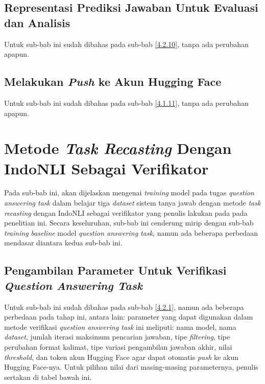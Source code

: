 \subsection{Representasi Prediksi Jawaban Untuk Evaluasi dan Analisis}
\label{4.3.12}
Untuk sub-bab ini sudah dibahas pada sub-bab \ref{4.2.10}, tanpa ada perubahan apapun.

\subsection{Melakukan \emph{Push} ke Akun Hugging Face}
\label{4.3.13}
Untuk sub-bab ini sudah dibahas pada sub-bab \ref{4.1.11}, tanpa ada perubahan apapun.

\section{Metode \emph{Task Recasting} Dengan IndoNLI Sebagai Verifikator}
\label{4.4}
Pada sub-bab ini, akan dijelaskan mengenai \emph{training} model pada tugas \emph{question answering task} dalam belajar tiga \emph{dataset} sistem tanya jawab dengan metode \emph{task recasting} dengan IndoNLI sebagai verifikator yang penulis lakukan pada pada penelitian ini. Secara keseluruhan, sub-bab ini cenderung mirip dengan sub-bab \emph{training} \emph{baseline} model \emph{question answering task}, namun ada beberapa perbedaan mendasar diantara kedua sub-bab ini.

\subsection{Pengambilan Parameter Untuk Verifikasi \emph{Question Answering Task}}
\label{4.4.1}
Untuk sub-bab ini sudah dibahas pada sub-bab \ref{4.2.1}, namun ada beberapa perbedaan pada tahap ini, antara lain: parameter yang dapat digunakan dalam metode verifikasi \emph{question answering task} ini meliputi: nama model, nama \emph{dataset}, jumlah iterasi maksimum pencarian jawaban, tipe \emph{filtering}, tipe perubahan format kalimat, tipe variasi pengambilan jawaban akhir, nilai \emph{threshold}, dan token akun Hugging Face agar dapat otomatis \emph{push} ke akun Hugging Face-nya. Untuk pilihan nilai dari masing-masing parameternya, penulis sertakan di tabel bawah ini.

